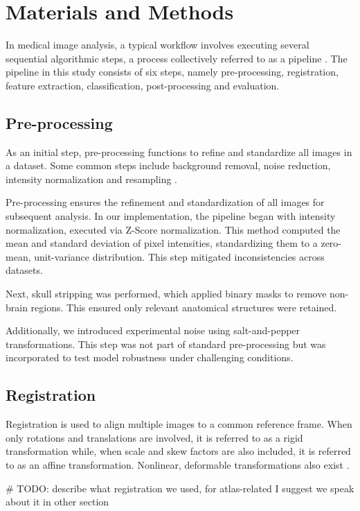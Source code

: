 \section{Materials and Methods}

In medical image analysis, a typical workflow involves executing several sequential algorithmic steps, a process collectively referred to as a pipeline \cite{b8}. The pipeline in this study consists of six steps, namely pre-processing, registration, feature extraction, classification, post-processing and evaluation.

\subsection{Pre-processing}

As an initial step, pre-processing functions to refine and standardize all images in a dataset. Some common steps include background removal, noise reduction, intensity normalization and resampling \cite{b9}.

Pre-processing ensures the refinement and standardization of all images for subsequent analysis. In our implementation, the pipeline began with intensity normalization, executed via Z-Score normalization. This method computed the mean and standard deviation of pixel intensities, standardizing them to a zero-mean, unit-variance distribution. This step mitigated inconsistencies across datasets.

Next, skull stripping was performed, which applied binary masks to remove non-brain regions. This ensured only relevant anatomical structures were retained.

Additionally, we introduced experimental noise using salt-and-pepper transformations. This step was not part of standard pre-processing but was incorporated to test model robustness under challenging conditions.

\subsection{Registration}

Registration is used to align multiple images to a common reference frame. When only rotations and translations are involved, it is referred to as a rigid transformation while, when scale and skew factors are also included, it is referred to as an affine transformation. Nonlinear, deformable transformations also exist \cite{b10}.

\# TODO: describe what registration we used, for atlas-related I suggest we speak about it in other section

